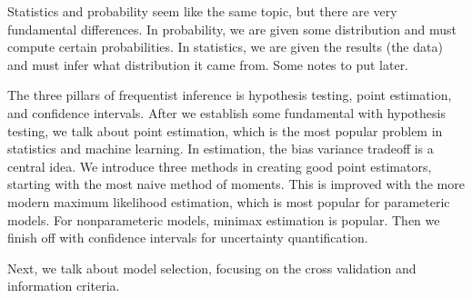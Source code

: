 Statistics and probability seem like the same topic, but there are very fundamental differences. In probability, we are given some distribution and must compute certain probabilities. In statistics, we are given the results (the data) and must infer what distribution it came from. Some notes to put later. 

The three pillars of frequentist inference is hypothesis testing, point estimation, and confidence intervals. After we establish some fundamental with hypothesis testing, we talk about point estimation, which is the most popular problem in statistics and machine learning. In estimation, the bias variance tradeoff is a central idea. We introduce three methods in creating good point estimators, starting with the most naive method of moments. This is improved with the more modern maximum likelihood estimation, which is most popular for parameteric models. For nonparameteric models, minimax estimation is popular. Then we finish off with confidence intervals for uncertainty quantification. 

Next, we talk about model selection, focusing on the cross validation and information criteria. 

